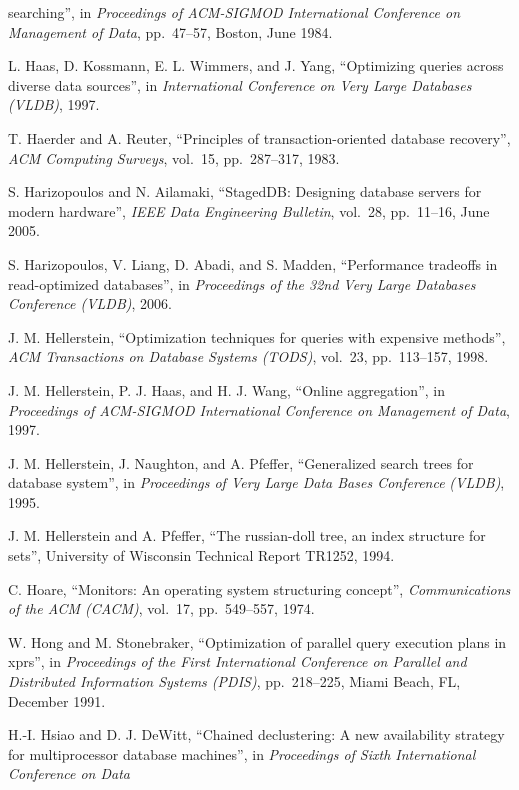 \documentclass[a4paper,11pt,twoside,openright]{book}
\begin{document}
\begin{enumerate}[label={[\arabic*]}]
  searching'', in \emph{Proceedings of ACM-SIGMOD International
  Conference on Management of Data}, pp.~47--57, Boston, June 1984.
\item
  L. Haas, D. Kossmann, E. L. Wimmers, and J. Yang, ``Optimizing queries
  across diverse data sources'', in \emph{International Conference on
  Very Large Databases} \emph{(VLDB)}, 1997.
\item
  T. Haerder and A. Reuter, ``Principles of transaction-oriented
  database recovery'', \emph{ACM Computing Surveys}, vol.~15,
  pp.~287--317, 1983.
\item
  S. Harizopoulos and N. Ailamaki, ``StagedDB: Designing database
  servers for modern hardware'', \emph{IEEE Data Engineering Bulletin},
  vol.~28, pp.~11--16, June 2005.
\item
  S. Harizopoulos, V. Liang, D. Abadi, and S. Madden, ``Performance
  tradeoffs in read-optimized databases'', in \emph{Proceedings of the
  32nd Very Large Databases} \emph{Conference (VLDB)}, 2006.
\item
  J. M. Hellerstein, ``Optimization techniques for queries with
  expensive methods'', \emph{ACM Transactions on Database Systems
  (TODS)}, vol.~23, pp.~113--157, 1998.
\item
  J. M. Hellerstein, P. J. Haas, and H. J. Wang, ``Online aggregation'',
  in \emph{Proceedings of ACM-SIGMOD International Conference on
  Management of Data}, 1997.
\item
  J. M. Hellerstein, J. Naughton, and A. Pfeffer, ``Generalized search
  trees for database system'', in \emph{Proceedings of Very Large Data
  Bases Conference} \emph{(VLDB)}, 1995.
\item
  J. M. Hellerstein and A. Pfeffer, ``The russian-doll tree, an index
  structure for sets'', University of Wisconsin Technical Report TR1252,
  1994.
\item
  C. Hoare, ``Monitors: An operating system structuring concept'',
  \emph{Communications of the ACM (CACM)}, vol.~17, pp.~549--557, 1974.
\item
  W. Hong and M. Stonebraker, ``Optimization of parallel query execution
  plans in xprs'', in \emph{Proceedings of the First International
  Conference on Parallel} \emph{and Distributed Information Systems
  (PDIS)}, pp.~218--225, Miami Beach, FL, December 1991.
\item
  H.-I. Hsiao and D. J. DeWitt, ``Chained declustering: A new
  availability strategy for multiprocessor database machines'', in
  \emph{Proceedings of Sixth International Conference on Data
}
\end{enumerate}
\end{document}
